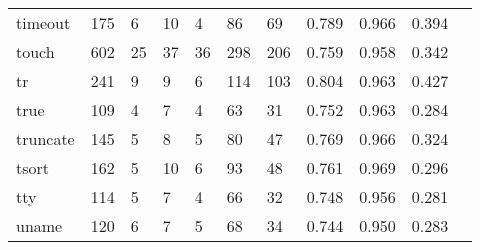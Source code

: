 \begin{longtable}{lp{1.10cm}p{1.10cm}p{1.10cm}p{1.10cm}p{1.10cm}p{1.10cm}p{1.10cm}p{1.10cm}p{1.10cm}p{1.10cm}}
timeout   &                    175 &                                  6 &                                10 &                                4 &                                86 &                              69 &                             0.789 &                                 0.966 &                               0.394 \\
touch     &                    602 &                                 25 &                                37 &                               36 &                               298 &                             206 &                             0.759 &                                 0.958 &                               0.342 \\
tr        &                    241 &                                  9 &                                 9 &                                6 &                               114 &                             103 &                             0.804 &                                 0.963 &                               0.427 \\
true      &                    109 &                                  4 &                                 7 &                                4 &                                63 &                              31 &                             0.752 &                                 0.963 &                               0.284 \\
truncate  &                    145 &                                  5 &                                 8 &                                5 &                                80 &                              47 &                             0.769 &                                 0.966 &                               0.324 \\
tsort     &                    162 &                                  5 &                                10 &                                6 &                                93 &                              48 &                             0.761 &                                 0.969 &                               0.296 \\
tty       &                    114 &                                  5 &                                 7 &                                4 &                                66 &                              32 &                             0.748 &                                 0.956 &                               0.281 \\
uname     &                    120 &                                  6 &                                 7 &                                5 &                                68 &                              34 &                             0.744 &                                 0.950 &                               0.283 \\

\end{longtable}
